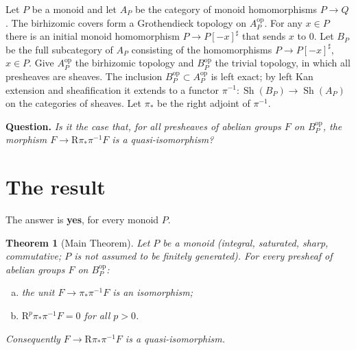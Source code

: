 \documentclass[11pt]{article}
\newtheorem{theorem}{Theorem}[section]
\theoremstyle{definition}
\theoremstyle{remark}
\newcommand{\Sh}{\operatorname{Sh}}
\begin{document}
Let $P$ be a monoid and let $A_P$ be the category of monoid homomorphisms $P\to Q$. The birhizomic covers form a Grothendieck topology on $A_P^{\mathrm{op}}$. For any $x\in P$ there is an initial monoid homomorphism $P\to P[-x]^\sharp$ that sends $x$ to $0$. Let $B_P$ be the full subcategory of $A_P$ consisting of the homomorphisms $P\to P[-x]^\sharp$, $x\in P$. Give $A_P^{\mathrm{op}}$ the birhizomic topology and $B_P^{\mathrm{op}}$ the trivial topology, in which all presheaves are sheaves. The inclusion $B_P^{\mathrm{op}}\subset A_P^{\mathrm{op}}$ is left exact; by left Kan extension and sheafification it extends to a functor $\pi^{-1}\colon \Sh(B_P)\to\Sh(A_P)$ on the categories of sheaves. Let $\pi_*$ be the right adjoint of $\pi^{-1}$.

\medskip\noindent\textbf{Question.} \emph{Is it the case that, for all presheaves of abelian groups $F$ on $B_P^{\mathrm{op}}$, the morphism $F\to \mathrm{R}\pi_*\pi^{-1}F$ is a quasi-isomorphism?}

\section{The result}

The answer is \textbf{yes}, for every monoid $P$.

\begin{theorem}[Main Theorem]\label{thm:main}
Let $P$ be a monoid (integral, saturated, sharp, commutative; $P$ is \emph{not} assumed to be finitely generated). For every presheaf of abelian groups $F$ on $B_P^{\mathrm{op}}$:
\begin{enumerate}[(a)]
\item the unit $F\to\pi_*\pi^{-1}F$ is an isomorphism;
\item $\mathrm{R}^p\pi_*\pi^{-1}F=0$ for all $p>0$.
\end{enumerate}
Consequently $F\to\mathrm{R}\pi_*\pi^{-1}F$ is a quasi-isomorphism.
\end{theorem}
\end{document}
